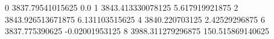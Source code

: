 0 3837.79541015625 0.0
1 3843.413330078125 5.617919921875
2 3843.926513671875 6.131103515625
4 3840.220703125 2.42529296875
6 3837.775390625 -0.02001953125
8 3988.311279296875 150.515869140625
